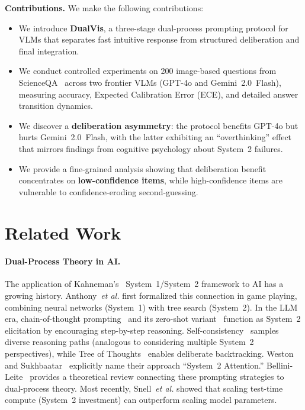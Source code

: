 \documentclass{cvpr}
\newcommand{\method}{DualVis}
\providecommand{\etal}{\textit{et al.}\xspace}
\begin{document}
\noindent\textbf{Contributions.} We make the following contributions:
\begin{itemize}
\item We introduce \textbf{\method{}}, a three-stage dual-process prompting protocol for VLMs that separates fast intuitive response from structured deliberation and final integration.
\item We conduct controlled experiments on 200 image-based questions from ScienceQA~\cite{lu2022learn} across two frontier VLMs (GPT-4o and Gemini~2.0~Flash), measuring accuracy, Expected Calibration Error (ECE), and detailed answer transition dynamics.
\item We discover a \textbf{deliberation asymmetry}: the protocol benefits GPT-4o but hurts Gemini~2.0~Flash, with the latter exhibiting an ``overthinking'' effect that mirrors findings from cognitive psychology about System~2 failures.
\item We provide a fine-grained analysis showing that deliberation benefit concentrates on \textbf{low-confidence items}, while high-confidence items are vulnerable to confidence-eroding second-guessing.
\end{itemize}

\section{Related Work}

\paragraph{Dual-Process Theory in AI.}
The application of Kahneman's~\cite{kahneman2011thinking} System~1/System~2 framework to AI has a growing history. Anthony~\etal\cite{anthony2017thinking} first formalized this connection in game playing, combining neural networks (System~1) with tree search (System~2). In the LLM era, chain-of-thought prompting~\cite{wei2022chain} and its zero-shot variant~\cite{kojima2022large} function as System~2 elicitation by encouraging step-by-step reasoning. Self-consistency~\cite{wang2023selfconsistency} samples diverse reasoning paths (analogous to considering multiple System~2 perspectives), while Tree of Thoughts~\cite{yao2023tree} enables deliberate backtracking. Weston and Sukhbaatar~\cite{weston2023system2attention} explicitly name their approach ``System~2 Attention.'' Bellini-Leite~\cite{bellinileite2024dual} provides a theoretical review connecting these prompting strategies to dual-process theory. Most recently, Snell~\etal\cite{snell2024scaling} showed that scaling test-time compute (System~2 investment) can outperform scaling model parameters.
\end{document}
